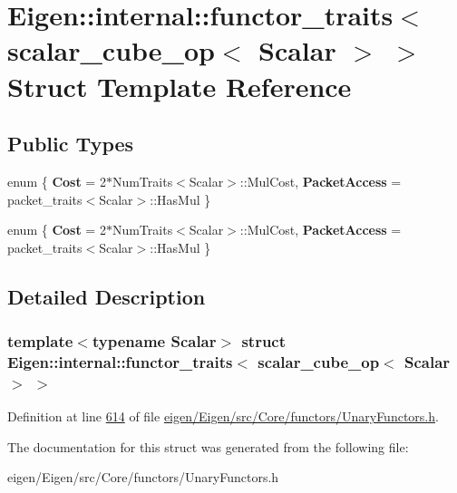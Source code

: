 \hypertarget{struct_eigen_1_1internal_1_1functor__traits_3_01scalar__cube__op_3_01_scalar_01_4_01_4}{}\section{Eigen\+:\+:internal\+:\+:functor\+\_\+traits$<$ scalar\+\_\+cube\+\_\+op$<$ Scalar $>$ $>$ Struct Template Reference}
\label{struct_eigen_1_1internal_1_1functor__traits_3_01scalar__cube__op_3_01_scalar_01_4_01_4}
\subsection*{Public Types}
\begin{DoxyCompactItemize}
\item 
\mbox{\label{struct_eigen_1_1internal_1_1functor__traits_3_01scalar__cube__op_3_01_scalar_01_4_01_4_af5cae1613f0f751877876a98a72003d3}} 
enum \{ {\bfseries Cost} = 2$\ast$\+Num\+Traits$<$Scalar$>$\+:\+:Mul\+Cost, 
{\bfseries Packet\+Access} = packet\+\_\+traits$<$Scalar$>$\+:\+:Has\+Mul
 \}
\item 
\mbox{\label{struct_eigen_1_1internal_1_1functor__traits_3_01scalar__cube__op_3_01_scalar_01_4_01_4_afb7fb22c678faceae2bc55442921fc54}} 
enum \{ {\bfseries Cost} = 2$\ast$\+Num\+Traits$<$Scalar$>$\+:\+:Mul\+Cost, 
{\bfseries Packet\+Access} = packet\+\_\+traits$<$Scalar$>$\+:\+:Has\+Mul
 \}
\end{DoxyCompactItemize}


\subsection{Detailed Description}
\subsubsection*{template$<$typename Scalar$>$\newline
struct Eigen\+::internal\+::functor\+\_\+traits$<$ scalar\+\_\+cube\+\_\+op$<$ Scalar $>$ $>$}



Definition at line \hyperlink{eigen_2_eigen_2src_2_core_2functors_2_unary_functors_8h_source_l00614}{614} of file \hyperlink{eigen_2_eigen_2src_2_core_2functors_2_unary_functors_8h_source}{eigen/\+Eigen/src/\+Core/functors/\+Unary\+Functors.\+h}.



The documentation for this struct was generated from the following file\+:\begin{DoxyCompactItemize}
\item 
eigen/\+Eigen/src/\+Core/functors/\+Unary\+Functors.\+h\end{DoxyCompactItemize}
